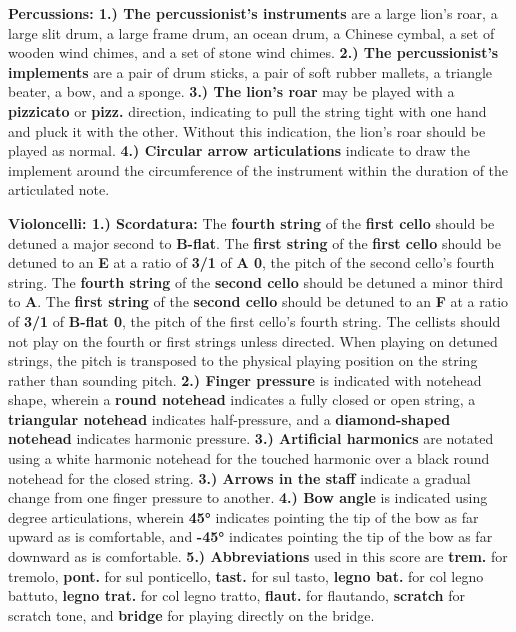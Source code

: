 \documentclass[12pt]{article}
\begin{document}
\begingroup
\textbf{Percussions: 1.) The percussionist's instruments} are a large lion's roar, a large slit drum, a large frame drum, an ocean drum, a Chinese cymbal, a set of wooden wind chimes, and a set of stone wind chimes. \textbf{2.) The percussionist's implements} are a pair of drum sticks, a pair of soft rubber mallets, a triangle beater, a bow, and a sponge. \textbf{3.) The lion's roar} may be played with a \textbf{pizzicato} or \textbf{pizz.} direction, indicating to pull the string tight with one hand and pluck it with the other. Without this indication, the lion's roar should be played as normal. \textbf{4.) Circular arrow articulations} indicate to draw the implement around the circumference of the instrument within the duration of the articulated note. 
\endgroup

\pagebreak

\begingroup
\textbf{Violoncelli: 1.) Scordatura:} The \textbf{fourth string} of the \textbf{first cello} should be detuned a major second to \textbf{B-flat}. The \textbf{first string} of the \textbf{first cello} should be detuned to an \textbf{E} at a ratio of \textbf{3/1} of \textbf{A 0}, the pitch of the second cello's fourth string. The \textbf{fourth string} of the \textbf{second cello} should be detuned a minor third to \textbf{A}. The \textbf{first string} of the \textbf{second cello} should be detuned to an \textbf{F} at a ratio of \textbf{3/1} of \textbf{B-flat 0}, the pitch of the first cello's fourth string. The cellists should not play on the fourth or first strings unless directed. When playing on detuned strings, the pitch is transposed to the physical playing position on the string rather than sounding pitch. \textbf{2.) Finger pressure} is indicated with notehead shape, wherein a \textbf{round notehead} indicates a fully closed or open string, a \textbf{triangular notehead} indicates half-pressure, and a \textbf{diamond-shaped notehead} indicates harmonic pressure. \textbf{3.) Artificial harmonics} are notated using a white harmonic notehead for the touched harmonic over a black round notehead for the closed string. \textbf{3.) Arrows in the staff} indicate a gradual change from one finger pressure to another. \textbf{4.) Bow angle} is indicated using degree articulations, wherein \textbf{45°} indicates pointing the tip of the bow as far upward as is comfortable, and \textbf{-45°} indicates pointing the tip of the bow as far downward as is comfortable. \textbf{5.) Abbreviations} used in this score are \textbf{trem.} for tremolo, \textbf{pont.} for sul ponticello, \textbf{tast.} for sul tasto,  \textbf{legno bat.} for col legno battuto, \textbf{legno trat.} for col legno tratto, \textbf{flaut.} for flautando, \textbf{scratch} for scratch tone, and \textbf{bridge} for playing directly on the bridge. 
\endgroup
\end{document}
